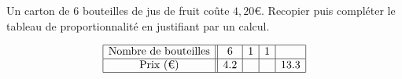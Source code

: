 
\begin{exercice}\label{exo2smath-0120}

Un carton de $6$ bouteilles de jus de fruit coûte $4,20$€. Recopier puis compléter le tableau de proportionnalité en justifiant par un calcul.  

\begin{equation*}
    \begin{array}[]{|c||c|c|c|c|}
        \hline
        \text{Nombre de bouteilles}&6&1&1&\\
        \hline
        \text{Prix (€)}&4.2&&&13.3\\
        \hline
    \end{array}
\end{equation*}

\end{exercice}
